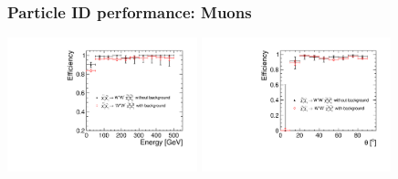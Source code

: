 \documentclass{beamer}
\begin{document}
\begin{frame}
\frametitle{Particle ID performance: Muons}
\includegraphics[width=5.5cm]{SIDMuonsEffVsEnergy.pdf}
\includegraphics[width=5.5cm]{SIDMuonsEffVsTheta.pdf}
\end{frame}
\end{document}

